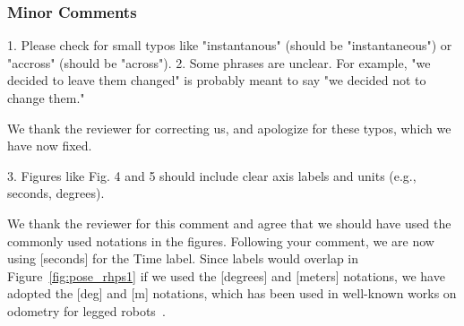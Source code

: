 \subsubsection{Minor Comments}
\begin{revquote}
1. Please check for small typos like "instantanous" (should be "instantaneous") or "accross" (should be "across").
2. Some phrases are unclear. For example, "we decided to leave them changed" is probably meant to say "we decided not to change them."
\end{revquote}

We thank the reviewer for correcting us, and apologize for these typos, which we have now fixed.

\begin{revquote}
3. Figures like Fig. 4 and 5 should include clear axis labels and units (e.g., seconds, degrees).
\end{revquote}

We thank the reviewer for this comment and agree that we should have used the commonly used notations in the figures. Following your comment, we are now using [seconds] for the Time label. Since labels would overlap in Figure~\ref{fig:pose_rhps1} if we used the [degrees] and [meters] notations, we have adopted the [deg] and [m] notations, which has been used in well-known works on odometry for legged robots~\cite{wisth2022vilens, Lin2005ALegConfigurationMeasSystemHexapod}. 